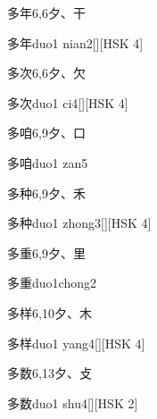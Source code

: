 \begin{entry}{多年}{6,6}{⼣、⼲}
  \begin{phonetics}{多年}{duo1 nian2}[][HSK 4]
  \end{phonetics}
\end{entry}

\begin{entry}{多次}{6,6}{⼣、⽋}
  \begin{phonetics}{多次}{duo1 ci4}[][HSK 4]
  \end{phonetics}
\end{entry}

\begin{entry}{多咱}{6,9}{⼣、⼝}
  \begin{phonetics}{多咱}{duo1 zan5}
  \end{phonetics}
\end{entry}

\begin{entry}{多种}{6,9}{⼣、⽲}
  \begin{phonetics}{多种}{duo1 zhong3}[][HSK 4]
  \end{phonetics}
\end{entry}

\begin{entry}{多重}{6,9}{⼣、⾥}
  \begin{phonetics}{多重}{duo1chong2}
  \end{phonetics}
\end{entry}

\begin{entry}{多样}{6,10}{⼣、⽊}
  \begin{phonetics}{多样}{duo1 yang4}[][HSK 4]
  \end{phonetics}
\end{entry}

\begin{entry}{多数}{6,13}{⼣、⽁}
  \begin{phonetics}{多数}{duo1 shu4}[][HSK 2]
  \end{phonetics}
\end{entry}

